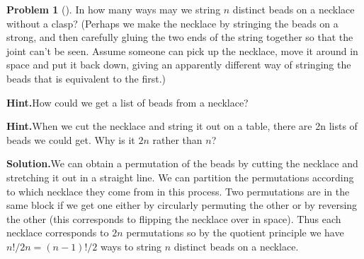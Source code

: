 \documentclass[10pt,]{book}
\theoremstyle{plain}
\theoremstyle{definition}
\newtheorem{activity}[project]{Problem}
\theoremstyle{definition}
\numberwithin{equation}{chapter}
\begin{document}
\begin{activity}[]\label{necklace}
In how many ways may we string \(n\) distinct beads on a necklace without a clasp? (Perhaps we make the necklace by stringing the beads on a strong, and then carefully gluing the two ends of the string together so that the joint can't be seen. Assume someone can pick up the necklace, move it around in space and put it back down, giving an apparently different way of stringing the beads that is equivalent to the first.)%
\par\medskip\noindent%
\textbf{Hint.}\quad How could we get a list of beads from a necklace?%
\par\medskip\noindent%
\textbf{Hint.}\quad When we cut the necklace and string it out on a table, there are 2n lists of beads we could get. Why is it \(2n\) rather than \(n\)?%
\par\medskip\noindent%
\textbf{Solution.}\quad We can obtain a permutation of the beads by cutting the necklace and stretching it out in a straight line. We can partition the permutations according to which necklace they come from in this process. Two permutations are in the same block if we get one either by circularly permuting the other or by reversing the other (this corresponds to flipping the necklace over in space). Thus each necklace corresponds to \(2n\) permutations so by the quotient principle we have \(n!/2n=(n-1)!/2\) ways to string \(n\) distinct beads on a necklace.%
\end{activity}
\end{document}
